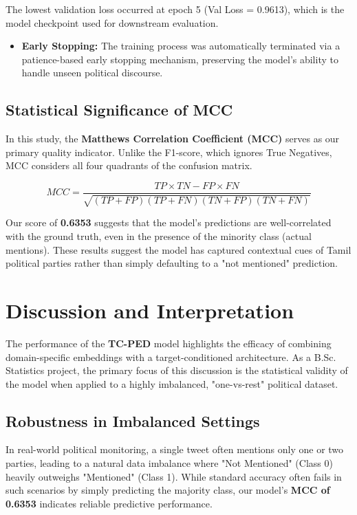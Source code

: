 \documentclass[12pt,a4paper]{article}
\begin{document}
The lowest validation loss occurred at epoch 5 (Val Loss = 0.9613), which is the model checkpoint used for downstream evaluation.

\begin{itemize}

    \item \textbf{Early Stopping:} The training process was automatically terminated via a patience-based early stopping mechanism, preserving the model's ability to handle unseen political discourse.
\end{itemize}

\subsection{Statistical Significance of MCC}
In this study, the \textbf{Matthews Correlation Coefficient (MCC)} serves as our primary quality indicator. Unlike the F1-score, which ignores True Negatives, MCC considers all four quadrants of the confusion matrix. 

\begin{equation}
MCC = \frac{TP \times TN - FP \times FN}{\sqrt{(TP+FP)(TP+FN)(TN+FP)(TN+FN)}}
\end{equation}

Our score of \textbf{0.6353} suggests that the model's predictions are well-correlated with the ground truth, even in the presence of the minority class (actual mentions). These results suggest the model has captured contextual cues of Tamil political parties rather than simply defaulting to a "not mentioned" prediction.

\section{Discussion and Interpretation}
The performance of the \textbf{TC-PED} model highlights the efficacy of combining domain-specific embeddings with a target-conditioned architecture. As a B.Sc. Statistics project, the primary focus of this discussion is the statistical validity of the model when applied to a highly imbalanced, "one-vs-rest" political dataset.

\subsection{Robustness in Imbalanced Settings}
In real-world political monitoring, a single tweet often mentions only one or two parties, leading to a natural data imbalance where "Not Mentioned" (Class 0) heavily outweighs "Mentioned" (Class 1). While standard accuracy often fails in such scenarios by simply predicting the majority class, our model’s \textbf{MCC of 0.6353} indicates reliable predictive performance.
\end{document}
